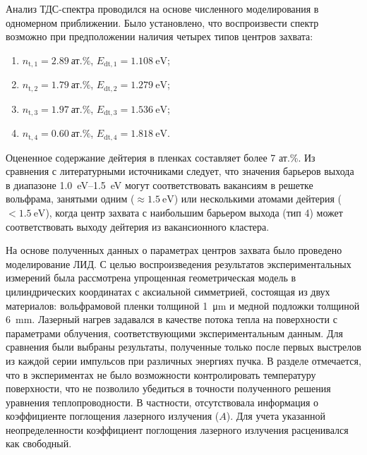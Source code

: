 Анализ ТДС-спектра проводился на основе численного моделирования в одномерном приближении. Было установлено, что воспроизвести спектр возможно при предположении наличия четырех типов центров захвата:
\begin{enumerate}[beginpenalty=10000]
    \item \( n_\mathrm{t,1}=\SI{2.89}{\text{ат.}\percent} \), \( E_\mathrm{dt,1}=\SI{1.108}{\electronvolt} \);
    \item \( n_\mathrm{t,2}=\SI{1.79}{\text{ат.}\percent} \), \( E_\mathrm{dt,2}=\SI{1.279}{\electronvolt} \);
    \item \( n_\mathrm{t,3}=\SI{1.97}{\text{ат.}\percent} \), \( E_\mathrm{dt,3}=\SI{1.536}{\electronvolt} \);
    \item \( n_\mathrm{t,4}=\SI{0.60}{\text{ат.}\percent} \), \( E_\mathrm{dt,4}=\SI{1.818}{\electronvolt} \).
\end{enumerate}
Оцененное содержание дейтерия в пленках составляет более 7 ат.\%. Из сравнения с литературными источниками следует, что значения барьеров выхода в диапазоне \SIrange{1.0}{1.5}{\electronvolt} могут соответствовать вакансиям в решетке вольфрама, занятыми одним (\(\approx\SI{1.5}{\electronvolt}\)) или несколькими атомами дейтерия (\(<\SI{1.5}{\electronvolt}\)), когда центр захвата с наибольшим барьером выхода (тип 4) может соответствовать выходу дейтерия из вакансионного кластера. 

На основе полученных данных о параметрах центров захвата было проведено моделирование ЛИД. С целью воспроизведения результатов экспериментальных измерений была рассмотрена упрощенная геометрическая модель в цилиндрических координатах с аксиальной симметрией, состоящая из двух материалов: вольфрамовой пленки толщиной \SI{1}{\micro\meter} и медной подложки толщиной \SI{6}{\milli\meter}. Лазерный нагрев задавался в качестве потока тепла на поверхности с параметрами облучения, соответствующими экспериментальным данным. Для сравнения были выбраны результаты, полученные только после первых выстрелов из каждой серии импульсов при различных энергиях пучка. В разделе отмечается, что в экспериментах не было возможности контролировать температуру поверхности, что не позволило убедиться в точности полученного решения уравнения теплопроводности. В частности, отсутствовала информация о коэффициенте поглощения лазерного излучения (\( A \)). Для учета указанной неопределенности коэффициент поглощения лазерного излучения расценивался как свободный.

